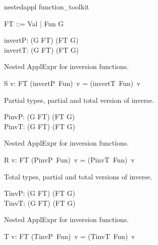 \documentclass{article}
\begin{document}
\begin{zsection}
\SECTION nestedappl \parents function\_toolkit
\end{zsection}

\begin{zed}
   [G]
\end{zed}

\begin{zed}
   FT ::= Val | Fun \ldata G \rdata
\end{zed}

\begin{axdef}
   invertP: (G \rel FT) \pfun (FT \rel G) \\
   invertT: (G \rel FT) \fun (FT \rel G) 
\end{axdef}

Nested ApplExpr for inversion functions.
\begin{schema}{S}
   v: FT
\where 
   (invertP~Fun)~v = (invertT~Fun)~v
\end{schema}

Partial types, partial and total version of inverse.
\begin{axdef}
   PinvP: (G \pfun FT) \pfun (FT \pfun G) \\
   PinvT: (G \pfun FT) \fun  (FT \pfun G) 
\end{axdef}

Nested ApplExpr for inversion functions.
\begin{schema}{R}
   v: FT
\where 
   (PinvP~Fun)~v = (PinvT~Fun)~v
\end{schema}

Total types, partial and total versions of inverse.
\begin{axdef}
   TinvP: (G \fun FT) \pfun (FT \fun G) \\
   TinvT: (G \fun FT) \fun  (FT \fun G) 
\end{axdef}

Nested ApplExpr for inversion functions.
\begin{schema}{T}
   v: FT
\where 
   (TinvP~Fun)~v = (TinvT~Fun)~v
\end{schema}
\end{document}
